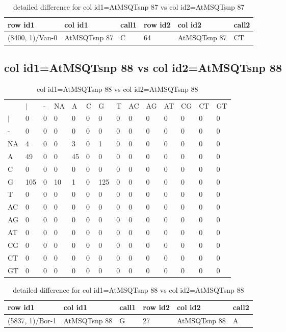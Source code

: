 \begin{center}
\begin{longtable}{|l|l|l|l|l|l|}
\caption{detailed difference for col id1=AtMSQTsnp 87 vs col id2=AtMSQTsnp 87} \label{table_dm973}\\
\hline
row id1&col id1&call1&row id2&col id2&call2\\
\hline
(8400, 1)/Van-0&AtMSQTsnp 87&C&64&AtMSQTsnp 87&CT\\
\hline
\end{longtable}
\end{center}

\subsection{col id1=AtMSQTsnp 88 vs col id2=AtMSQTsnp 88}
\begin{center}
\begin{longtable}{|l|l|l|l|l|l|l|l|l|l|l|l|l|l|}
\caption{col id1=AtMSQTsnp 88 vs col id2=AtMSQTsnp 88} \label{table_dm974}\\
\hline
\\
\hline
&$|$&-&NA&A&C&G&T&AC&AG&AT&CG&CT&GT\\
$|$&0&0&0&0&0&0&0&0&0&0&0&0&0\\
-&0&0&0&0&0&0&0&0&0&0&0&0&0\\
NA&4&0&0&3&0&1&0&0&0&0&0&0&0\\
A&49&0&0&45&0&0&0&0&0&0&0&0&0\\
C&0&0&0&0&0&0&0&0&0&0&0&0&0\\
G&105&0&10&1&0&125&0&0&0&0&0&0&0\\
T&0&0&0&0&0&0&0&0&0&0&0&0&0\\
AC&0&0&0&0&0&0&0&0&0&0&0&0&0\\
AG&0&0&0&0&0&0&0&0&0&0&0&0&0\\
AT&0&0&0&0&0&0&0&0&0&0&0&0&0\\
CG&0&0&0&0&0&0&0&0&0&0&0&0&0\\
CT&0&0&0&0&0&0&0&0&0&0&0&0&0\\
GT&0&0&0&0&0&0&0&0&0&0&0&0&0\\
\hline
\end{longtable}
\end{center}

\begin{center}
\begin{longtable}{|l|l|l|l|l|l|}
\caption{detailed difference for col id1=AtMSQTsnp 88 vs col id2=AtMSQTsnp 88} \label{table_dm975}\\
\hline
row id1&col id1&call1&row id2&col id2&call2\\
\hline
(5837, 1)/Bor-1&AtMSQTsnp 88&G&27&AtMSQTsnp 88&A\\
\hline
\end{longtable}
\end{center}

